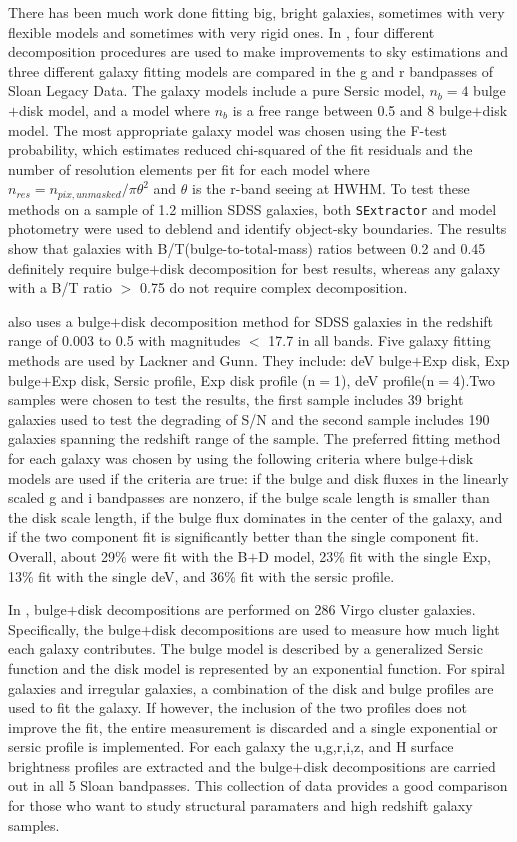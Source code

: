 \documentclass[12pt,preprint,pdftex]{aastex}
\begin{document}
There has been much work done fitting big, bright galaxies, sometimes
with very flexible models and sometimes with very rigid ones. In
\cite{simard11}, four different decomposition procedures are used to
make improvements to sky estimations and three different galaxy
fitting models are compared in the g and r bandpasses of Sloan Legacy
Data. The galaxy models include a pure Sersic model, $n_b=4$
bulge$+$disk model, and a model where $n_b$ is a free range between
0.5 and 8 bulge$+$disk model. The most appropriate galaxy model was
chosen using the F-test probability, which estimates reduced chi-squared of
the fit residuals and the number of resolution elements per fit for
each model where $n_{res}=n_{pix,unmasked}/ \pi\theta^2$ and $\theta$
is the r-band seeing at HWHM. To test these methods on a sample of
1.2 million SDSS galaxies, both \verb|SExtractor| and model photometry were used
to deblend and identify object-sky boundaries. The results show that
galaxies with B/T(bulge-to-total-mass) ratios between 0.2 and 0.45
definitely require bulge$+$disk decomposition for best results,
whereas any galaxy with a B/T ratio $>$ 0.75 do not require complex
decomposition.

\cite{lackner} also uses a bulge$+$disk decomposition method for SDSS
galaxies in the redshift range of 0.003 to 0.5 with magnitudes $<$
17.7 in all bands. Five galaxy fitting methods are used by Lackner and
Gunn. They include: deV bulge$+$Exp disk, Exp bulge$+$Exp disk, Sersic
profile, Exp disk profile (n$=$1), deV profile(n$=$4).Two samples were
chosen to test the results, the first sample includes 39 bright
galaxies used to test the degrading of S/N and the second sample
includes 190 galaxies spanning the redshift range of the sample. The
preferred fitting method for each galaxy was chosen by using the
following criteria where bulge$+$disk models are used if the criteria
are true: if the bulge and disk fluxes in the linearly scaled g and i
bandpasses are nonzero, if the bulge scale length is smaller than the
disk scale length, if the bulge flux dominates in the center of the
galaxy, and if the two component fit is significantly better than the
single component fit. Overall, about 29\% were fit with the B$+$D
model, 23\% fit with the single Exp, 13\% fit with the single deV, and
36\% fit with the sersic profile.

In \cite{mcdonald}, bulge$+$disk decompositions are performed on 286
Virgo cluster galaxies. Specifically, the bulge$+$disk decompositions
are used to measure how much light each galaxy contributes. The bulge
model is described by a generalized Sersic function and the disk model
is represented by an exponential function. For spiral galaxies and
irregular galaxies, a combination of the disk and bulge profiles are
used to fit the galaxy. If however, the inclusion of the two profiles
does not improve the fit, the entire measurement is discarded and a
single exponential or sersic profile is implemented. For each galaxy
the u,g,r,i,z, and H surface brightness profiles are extracted and the
bulge$+$disk decompositions are carried out in all 5 Sloan
bandpasses. This collection of data provides a good comparison for
those who want to study structural paramaters and high redshift galaxy
samples.
\end{document}

